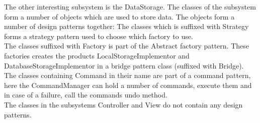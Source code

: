 The other interesting subsystem is the DataStorage. The classes of the subsystem form a number of objects which are used to store data. The objects form a number of design patterns together: The classes which is suffixed with Strategy forms a strategy pattern used to choose which factory to use. \\The classes suffixed with Factory is part of the Abstract factory pattern. These factories creates the products LocalStorageImplementor and DatabaseStorageImplementor in a bridge pattern class (suffixed with Bridge). \\The classes containing Command in their name are part of a command pattern, here the CommandManager can hold a number of commands, execute them and in case of a failure, call the commands undo method.\\

The classes in the subsystems Controller and View do not contain any design patterns.